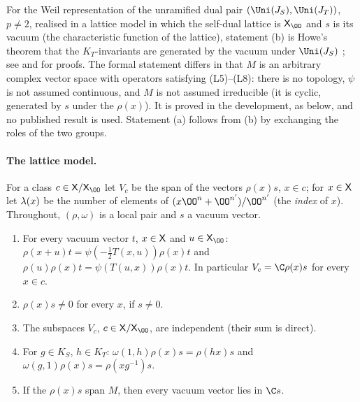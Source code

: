 \begin{remark}\label{pf:sh-misc:howerem}
For the Weil representation of the unramified dual pair $(\Uni(J_S),\Uni(J_T))$, $p\ne2$, realised in a lattice model in which the
self-dual lattice is $\shmiscXO$ and $s$ is its vacuum (the characteristic function of the lattice), statement (b) is Howe's
theorem that the $K_T$-invariants are generated by the vacuum under $\Uni(J_S)$ \cite{Howe1979}; see
\cite[Ch.~5]{MoeglinVignerasWaldspurger1987} and \cite{Waldspurger1990} for proofs. The formal statement differs in that $M$ is an
arbitrary complex vector space with operators satisfying (L5)--(L8): there is no topology, $\psi$ is not assumed continuous, and
$M$ is not assumed irreducible (it is cyclic, generated by $s$ under the $\rho(x)$). It is proved in the development, as below, and
no published result is used. Statement (a) follows from (b) by exchanging the roles of the two groups.
\end{remark}

\paragraph{The lattice model.}
For a class $c\in\shmiscX/\shmiscXO$ let $V_c$ be the span of the vectors $\rho(x)s$, $x\in c$; for $x\in\mathsf X$ let
$\lambda(x)$ be the number of elements of $(x\OO^n+\OO^{n'})/\OO^{n'}$ (the \emph{index} of $x$). Throughout, $(\rho,\omega)$ is a local
pair and $s$ a vacuum vector.

\begin{lemma}\label{pf:sh-misc:lattice}
\begin{enumerate}[label=(\alph*)]
\item For every vacuum vector $t$, $x\in\mathsf X$ and $u\in\shmiscXO$: $\rho(x+u)t=\psi(-\frac12T(x,u))\rho(x)t$ and
$\rho(u)\rho(x)t=\psi(T(u,x))\rho(x)t$. In particular $V_c=\C\rho(x)s$ for every $x\in c$.
\item $\rho(x)s\ne0$ for every $x$, if $s\ne0$.
\item The subspaces $V_c$, $c\in\shmiscX/\shmiscXO$, are independent (their sum is direct).
\item For $g\in K_S$, $h\in K_T$: $\omega(1,h)\rho(x)s=\rho(hx)s$ and $\omega(g,1)\rho(x)s=\rho(xg^{-1})s$.
\item If the $\rho(x)s$ span $M$, then every vacuum vector lies in $\C s$.
\end{enumerate}
\end{lemma}

